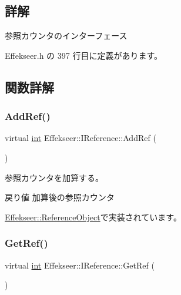 \subsection{詳解}
参照カウンタのインターフェース 

 Effekseer.\+h の 397 行目に定義があります。



\subsection{関数詳解}
\mbox{\label{class_effekseer_1_1_i_reference_a3e3b54e8e5081e24f5784e4f9b8f6257}} 
\subsubsection{\texorpdfstring{Add\+Ref()}{AddRef()}}
{\footnotesize\ttfamily virtual \mbox{\hyperlink{namespace_effekseer_ace0abf7c2e6947e519ebe8b54cbcc30a}{int}} Effekseer\+::\+I\+Reference\+::\+Add\+Ref (\begin{DoxyParamCaption}{ }\end{DoxyParamCaption})\hspace{0.3cm}{\ttfamily [pure virtual]}}



参照カウンタを加算する。 

\begin{DoxyReturn}{戻り値}
加算後の参照カウンタ 
\end{DoxyReturn}


\mbox{\hyperlink{class_effekseer_1_1_reference_object_a1cc3feeee39b72aea152ed223dbd0fa7}{Effekseer\+::\+Reference\+Object}}で実装されています。

\mbox{\label{class_effekseer_1_1_i_reference_a95274c788c8c03d27a3e424facc728b6}} 
\subsubsection{\texorpdfstring{Get\+Ref()}{GetRef()}}
{\footnotesize\ttfamily virtual \mbox{\hyperlink{namespace_effekseer_ace0abf7c2e6947e519ebe8b54cbcc30a}{int}} Effekseer\+::\+I\+Reference\+::\+Get\+Ref (\begin{DoxyParamCaption}{ }\end{DoxyParamCaption})\hspace{0.3cm}{\ttfamily [pure virtual]}}



